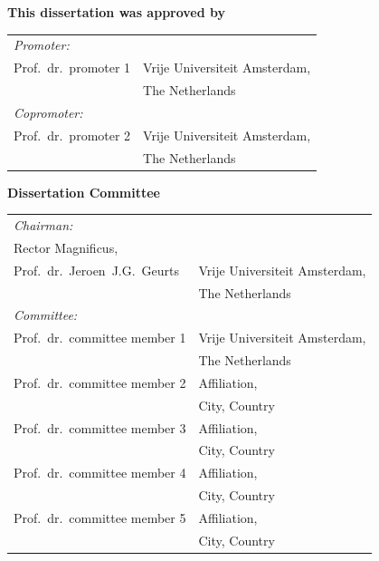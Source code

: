 \noindent \textbf{This dissertation was approved by}

\medskip\noindent
\begin{tabular}{p{4.5cm}l}
    \mbox{\emph{Promoter:}} & \\
    Prof.~dr.~promoter 1
    & Vrije Universiteit Amsterdam, \\ & The Netherlands \\

    \mbox{\emph{Copromoter:}} & \\
    Prof.~dr.~promoter 2
    & Vrije Universiteit Amsterdam, \\ & The Netherlands \\
\end{tabular}

\bigskip
\noindent \textbf{Dissertation Committee}

\medskip\noindent
\begin{tabular}{p{4.5cm}l}
    \mbox{\emph{Chairman:}} & \\
    Rector Magnificus, &  \\
    Prof.~dr.~Jeroen~J.G.~Geurts 
    & Vrije Universiteit Amsterdam, \\ & The Netherlands \\

    \medskip
    \mbox{\emph{Committee:}} & \\
    Prof.~dr.~committee member 1
    & Vrije Universiteit Amsterdam, \\ & The Netherlands \\
    
    Prof.~dr.~committee member 2
    & Affiliation, \\ & City, Country \\
    
    Prof.~dr.~committee member 3
    & Affiliation, \\ & City, Country \\
    
    Prof.~dr.~committee member 4
    & Affiliation, \\ & City, Country \\
    
    Prof.~dr.~committee member 5
    & Affiliation, \\ & City, Country \\
\end{tabular}

